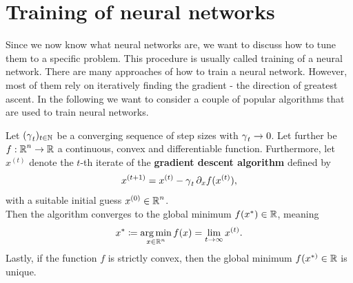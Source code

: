 \section{Training of neural networks}

Since we now know what neural networks are, we want to discuss how to tune them to a specific problem. This procedure is usually called training of a neural network. There are many approaches of how to train a neural network. However, most of them rely on iteratively finding the gradient - the direction of greatest ascent. In the following we want to consider a couple of popular algorithms that are used to train neural networks.


\begin{theorem}\label{theorem_gd}
Let $(\operatorname{\gamma}_t)_{t \in \operatorname{\mathbb{N}}}$ be a converging sequence of step sizes with $\operatorname{\gamma}_t \to 0$. Let further be $f:\operatorname{\mathbb{R}}^n \to \operatorname{\mathbb{R}}$ a continuous, convex and differentiable function. Furthermore, let $x^{(t)}$ denote the $t$-th iterate of the \textbf{gradient descent algorithm} defined by
\begin{align}
x^{(t+1)} = x^{(t)} - \operatorname{\gamma}_t \partial_x f(x^{(t)}),
\end{align}
with a suitable initial guess $x^{(0)}\in \operatorname{\mathbb{R}}^n$.\\
Then the algorithm converges to the global minimum $f(x^{\ast})\in \operatorname{\mathbb{R}}$, meaning
\begin{align*}
x^{\ast} \coloneqq \operatorname*{arg\,min}_{x\in\operatorname{\mathbb{R}}^n}f(x) = \lim_{t\to\infty} x^{(t)}.
\end{align*}
Lastly, if the function $f$ is strictly convex, then the global minimum $f(x^{\ast)}\in\operatorname{\mathbb{R}}$ is unique.
\end{theorem}



